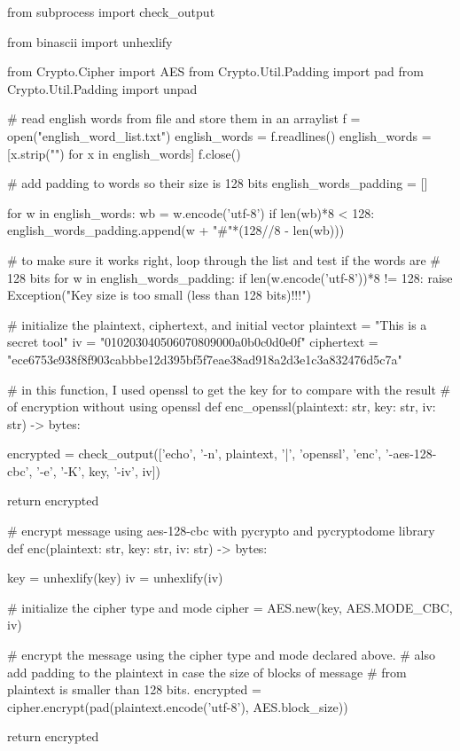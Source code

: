 \documentclass{article}
\begin{document}
\begin{python}
from subprocess import check_output

from binascii import unhexlify

from Crypto.Cipher import AES
from Crypto.Util.Padding import pad
from Crypto.Util.Padding import unpad

# read english words from file and store them in an arraylist
f = open("english_word_list.txt")
english_words = f.readlines()
english_words = [x.strip("\n") for x in english_words]
f.close()

# add padding to words so their size is 128 bits
english_words_padding = []

for w in english_words:
    wb = w.encode('utf-8')
    if len(wb)*8 < 128:
        english_words_padding.append(w + "#"*(128//8 - len(wb)))

# to make sure it works right, loop through the list and test if the words are
# 128 bits
for w in english_words_padding:
    if len(w.encode('utf-8'))*8 != 128:
        raise Exception("Key size is too small (less than 128 bits)!!!")

# initialize the plaintext, ciphertext, and initial vector
plaintext = "This is a secret tool"
iv = "010203040506070809000a0b0c0d0e0f"
ciphertext = "ece6753e938f8f903cabbbe12d395bf5f7eae38ad918a2d3e1c3a832476d5c7a"


# in this function, I used openssl to get the key for to compare with the result
# of encryption without using openssl
def enc_openssl(plaintext: str, key: str, iv: str) -> bytes:

    encrypted = check_output(['echo', '-n', plaintext, '|', 'openssl', 'enc',
                              '-aes-128-cbc', '-e', '-K', key, '-iv', iv])

    return encrypted


# encrypt message using aes-128-cbc with pycrypto and pycryptodome library
def enc(plaintext: str, key: str, iv: str) -> bytes:

    key = unhexlify(key)
    iv = unhexlify(iv)

    # initialize the cipher type and mode
    cipher = AES.new(key, AES.MODE_CBC, iv)

    # encrypt the message using the cipher type and mode declared above.
    # also add padding to the plaintext in case the size of blocks of message
    # from plaintext is smaller than 128 bits.
    encrypted = cipher.encrypt(pad(plaintext.encode('utf-8'), AES.block_size))

    return encrypted



\end{python}
\end{document}
